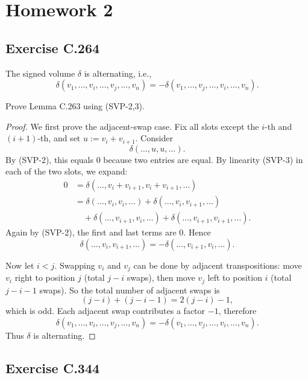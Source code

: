 \documentclass{article}
\begin{document}
\section{Homework 2}

\subsection{Exercise C.264}

\begin{lemma}[Lemma C.263]
  The signed volume $\delta$ is alternating, i.e.,
  \[
    \delta(v_1, \dots, v_i, \dots, v_j, \dots, v_n)
    = -\delta(v_1, \dots, v_j, \dots, v_i, \dots, v_n).
  \]
\end{lemma}

Prove Lemma C.263 using (SVP-2,3).

\begin{proof}
  We first prove the adjacent-swap case. Fix all slots except the
  $i$-th and $(i+1)$-th, and set $u := v_i + v_{i+1}$. Consider
  \[
    \delta(\dots, u, u, \dots).
  \]
  By (SVP-2), this equals $0$ because two entries are equal.
  By linearity (SVP-3) in each of the two slots, we expand:
  \[
    \begin{aligned}
      0
      &= \delta(\dots, v_i+v_{i+1}, v_i+v_{i+1}, \dots) \\
      &= \delta(\dots, v_i, v_i, \dots)
      + \delta(\dots, v_i, v_{i+1}, \dots) \\
      &\quad + \delta(\dots, v_{i+1}, v_i, \dots)
      + \delta(\dots, v_{i+1}, v_{i+1}, \dots).
    \end{aligned}
  \]
  Again by (SVP-2), the first and last terms are $0$. Hence
  \[
    \delta(\dots, v_i, v_{i+1}, \dots)
    = -\delta(\dots, v_{i+1}, v_i, \dots).
  \]

  Now let $i<j$. Swapping $v_i$ and $v_j$ can be done by adjacent
  transpositions:
  move $v_i$ right to position $j$ (total $j-i$ swaps), then move
  $v_j$ left to position $i$ (total $j-i-1$ swaps). So the total number
  of adjacent swaps is
  \[
    (j-i)+(j-i-1)=2(j-i)-1,
  \]
  which is odd. Each adjacent swap contributes a factor $-1$, therefore
  \[
    \delta(v_1,\dots,v_i,\dots,v_j,\dots,v_n)
    = -\delta(v_1,\dots,v_j,\dots,v_i,\dots,v_n).
  \]
  Thus $\delta$ is alternating.
\end{proof}

\subsection{Exercise C.344}
\end{document}
